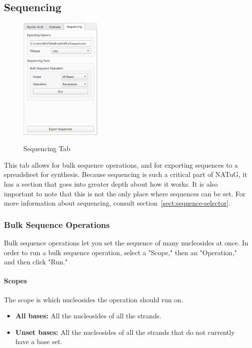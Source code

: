 \documentclass[titlepage]{article}
\begin{document}
\subsection{Sequencing}

\begin{figure}[h]
	\centering
	\caption{Sequencing Tab}
	\includegraphics[height=2.4in]{sequencing-tab.png}
	\label{fig:sequencing-tab}
\end{figure}

This tab allows for bulk sequence operations, and for exporting sequences to a spreadsheet for synthesis. Because sequencing is such a critical part of NATuG, it has a section that goes into greater depth about how it works. It is also important to note that this is not the only place where sequences can be set. For more information about sequencing, consult section~\ref{sect:sequence-selector}.

\subsubsection{Bulk Sequence Operations}
Bulk sequence operations let you set the sequence of many nucleosides at once. In order to run a bulk sequence operation, select a "Scope," then an "Operation," and then click "Run."

\paragraph{Scopes}
The scope is which nucleosides the operation should run on.

\begin{itemize}
	\item \textbf{All bases:} All the nucleosides of all the strands.
	\item \textbf{Unset bases:} All the nucleosides of all the strands that do not currently have a base set.
\end{itemize}
\end{document}
